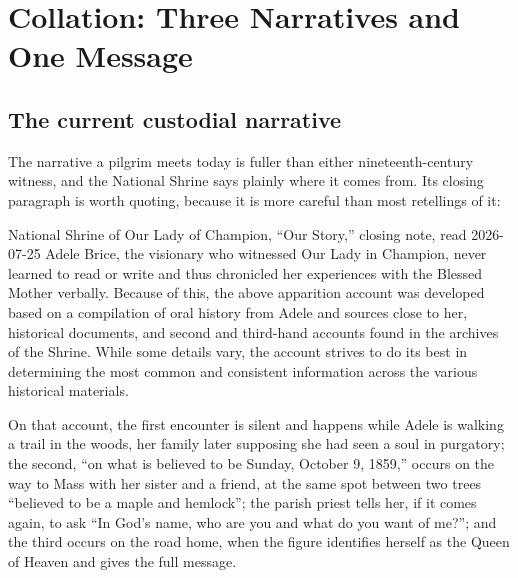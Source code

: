 \section{Collation: Three Narratives and One Message}

\subsection{The current custodial narrative}

The narrative a pilgrim meets today is fuller than either
nineteenth-century witness, and the National Shrine says plainly where
it comes from. Its closing paragraph is worth quoting, because it is
more careful than most retellings of it:

\begin{witnesstext}{National Shrine of Our Lady of Champion, ``Our
Story,'' closing note, read 2026-07-25}
Adele Brice, the visionary who witnessed Our Lady in Champion, never
learned to read or write and thus chronicled her experiences with the
Blessed Mother verbally. Because of this, the above apparition account
was developed based on a compilation of oral history from Adele and
sources close to her, historical documents, and second and third-hand
accounts found in the archives of the Shrine. While some details vary,
the account strives to do its best in determining the most common and
consistent information across the various historical
materials.
\end{witnesstext}

On that account, the first encounter is silent and happens while Adele
is walking a trail in the woods, her family later supposing she had
seen a soul in purgatory; the second, ``on what is believed to be
Sunday, October 9, 1859,'' occurs on the way to Mass with her sister
and a friend, at the same spot between two trees ``believed to be a
maple and hemlock''; the parish priest tells her, if it comes again, to
ask ``In God's name, who are you and what do you want of me?''; and the
third occurs on the road home, when the figure identifies herself as
the Queen of Heaven and gives the full message.

